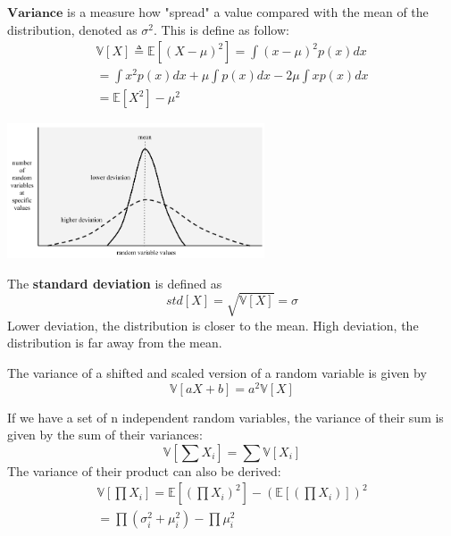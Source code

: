 \documentclass[10pt,landscape]{article}
\begin{document}
\begin{multicols*}{3}
\begin{equation*}
    \end{equation*}
    $\textbf{Variance}$ is a measure how "spread" a value compared with the mean of the distribution, denoted as $\sigma^2$. This is define as follow:
    \begin{equation*}
        \begin{split}
        \mathbb{V}[X] \triangleq \mathbb{E}[(X- \mu)^2] =\int(x-\mu)^2p(x)dx \\
        = \int x^2p(x)dx+\mu\int p(x)dx-2\mu\int{xp(x)dx}\\
        =\mathbb{E}[X^2]-\mu^2
        \end{split}
    \end{equation*}
    \begin{minipage}{\linewidth}
            \centering
            \includegraphics[width=3in]{figures/Variance.png}
    \end{minipage}
    The \textbf{standard deviation} is defined as
    \begin{equation*}
        std[X]=\sqrt{\mathbb{V}[X]}=\sigma
    \end{equation*}
    Lower deviation, the distribution is closer to the mean. High deviation, the distribution is far away from the mean.

    The variance of a shifted and scaled version of a random variable is given by
    \begin{equation*}
        \mathbb{V}[aX+b]=a^2\mathbb{V}[X]
    \end{equation*}

    If we have a set of n independent random variables, the variance of their sum is given by the sum of their variances:
    \begin{equation*}
        \mathbb{V}[\sum X_i]=\sum \mathbb{V}[X_i]
    \end{equation*}
    The variance of their product can also be derived:  
    \begin{equation*}
        \begin{split}
            \mathbb{V}[\prod X_i]= \mathbb{E}[(\prod X_i)^2]-(\mathbb{E}[(\prod X_i)])^2 \\
            = \prod(\sigma_i^2 + \mu_i^2)-\prod\mu_i^2
        \end{split}
    \end{equation*}


\end{multicols*}
\end{document}
